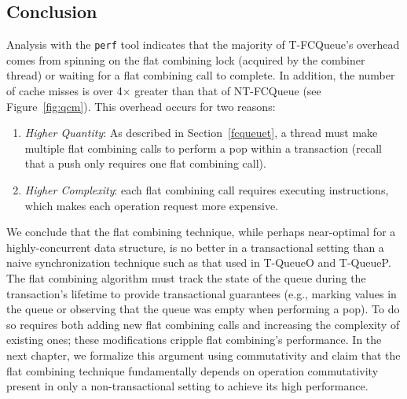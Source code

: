 \vspace{12pt}
\noindent{}

\subsection{Conclusion}
Analysis with the \texttt{perf} tool indicates that the majority of T-FCQueue's overhead comes from spinning on the flat combining lock (acquired by the combiner thread) or waiting for a flat combining call to complete. In addition, the number of cache misses is over 4$\times$ greater than that of NT-FCQueue (see Figure~\ref{fig:qcm}). This overhead occurs for two reasons:
\begin{enumerate}
    \item \emph{Higher Quantity}: As described in Section~\ref{fcqueuet}, a thread must make multiple flat combining calls to perform a pop within a transaction (recall that a push only requires one flat combining call).
\item \emph{Higher Complexity}: each flat combining call requires executing instructions, which makes each operation request more expensive.
\end{enumerate}

We conclude that the flat combining technique, while perhaps near-optimal for a highly-concurrent data structure, is no better in a transactional setting than a naive synchronization technique such as that used in T-QueueO and T-QueueP. The flat combining algorithm must track the state of the queue during the transaction's lifetime to provide transactional guarantees (e.g., marking values in the queue or observing that the queue was empty when performing a pop). To do so requires both adding new flat combining calls and increasing the complexity of existing ones; these modifications cripple flat combining's performance.
In the next chapter, we formalize this argument using commutativity and claim that the flat combining technique fundamentally depends on operation commutativity present in only a non-transactional setting to achieve its high performance. 
